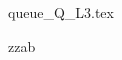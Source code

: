 \documentclass{exam}
\begin{document}


\begin{questions}

          \printanswers



    {queue_Q_L3.tex}





               \question  zzab



\end{questions}
\end{document}
